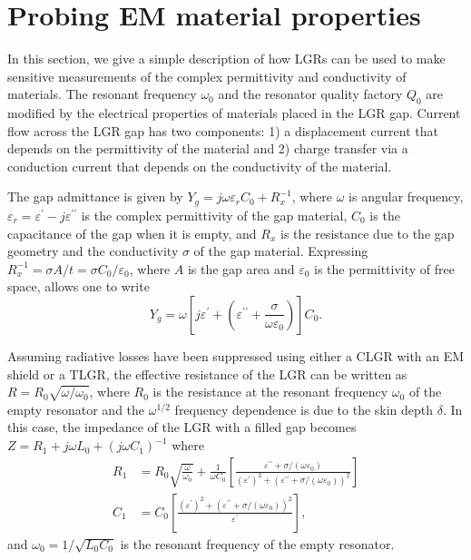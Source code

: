 \documentclass[conference]{IEEEtran}
\begin{document}
\section{Probing EM material properties}

In this section, we give a simple description of how LGRs can be used to make sensitive measurements of the complex permittivity and conductivity of materials. The resonant frequency $\omega_0$ and the resonator quality factory $Q_0$ are modified by the electrical properties of materials placed in the LGR gap.  Current flow across the LGR gap has two components: 1) a displacement current that depends on the permittivity of the material and 2) charge transfer via a conduction current that depends on the conductivity of the material.

The gap admittance  is given by $Y_g=j\omega\varepsilon_r C_0+R_x^{-1}$, where $\omega$ is angular frequency, \mbox{$\varepsilon_r=\varepsilon^\prime-j\varepsilon^{\prime\prime}$} is the complex permittivity of the gap material, $C_0$ is the capacitance of the gap when it is empty, and $R_x$ is the resistance due to the gap geometry and the conductivity $\sigma$ of the gap material.  Expressing $R_x^{-1}=\sigma A/t=\sigma C_0/\varepsilon_0$, where $A$ is the gap area and $\varepsilon_0$ is the permittivity of free space, allows one to write
\begin{equation}
    Y_g=\omega\left[j\varepsilon^\prime + \left(\varepsilon^{\prime\prime}+\frac{\sigma}{\omega\varepsilon_0}\right)\right]C_0.
\end{equation}

Assuming radiative losses have been suppressed using either a CLGR with an EM shield or a TLGR, the effective resistance of the LGR can be written as $R=R_0\sqrt{\omega/\omega_0}$, where $R_0$ is the resistance at the resonant frequency $\omega_0$ of the empty resonator and the $\omega^{1/2}$ frequency dependence is due to the skin depth $\delta$.   In this case, the impedance of the LGR with a filled gap becomes $Z=R_1 + j\omega L_0 +\left(j\omega C_1\right)^{-1}$ where
\begin{align}
    R_1 &=R_0\sqrt{\frac{\omega}{\omega_0}}+\frac{1}{\omega C_0}\left[\frac{\varepsilon^{\prime\prime}+\sigma/\left(\omega\varepsilon_0\right)}{\left(\varepsilon^\prime\right)^2+\left(\varepsilon^{\prime\prime} +\sigma/\left(\omega\varepsilon_0\right)\right)^2}\right]\\
    C_1 &=C_0\left[\frac{\left(\varepsilon^\prime\right)^2+\left(\varepsilon^{\prime\prime} +\sigma/\left(\omega\varepsilon_0\right)\right)^2}{\varepsilon^\prime}\right],
\end{align}
and $\omega_0=1/\sqrt{L_0C_0}$ is the resonant frequency of the empty resonator.
\end{document}
